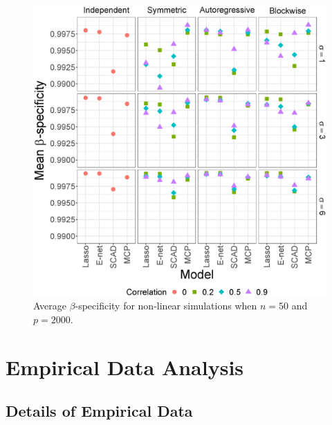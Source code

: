 \documentclass{article}
\begin{document}
\begin{figure}[h!]
\begin{minipage}[t]{0.47\textwidth}
			\includegraphics[width = \textwidth]{images/facet/publication_facet_specificity_2_50_2000.eps}
			\captionsetup{width = 0.95\textwidth}
			\caption{Average $\beta$-specificity for non-linear simulations when $n = 50$ and $p = 	2000$.}
			\label{fig:nonlinear-sensitivity}
		\end{minipage}
	\end{figure}
	
	\section{Empirical Data Analysis}\label{sec:empirical}
	\subsection{Details of Empirical Data}
	
\end{document}
